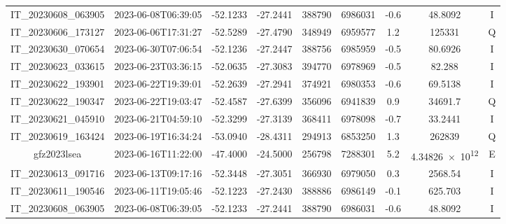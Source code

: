 \begin{center}
\begin{longtable}{ccccS[table-format=6.0]S[table-format=7.0]ccc}
\begin{adjustbox}{width=\textwidth}
    IT\_20230608\_063905 & 2023-06-08T06:39:05 & -52.1233 & -27.2441 & 388790 & 6986031 & -0.6 & \num[round-precision=3,round-mode=figures,scientific-notation=true]{48.8092} & I \\
    IT\_20230606\_173127 & 2023-06-06T17:31:27 & -52.5289 & -27.4790 & 348949 & 6959577 & 1.2 & \num[round-precision=3,round-mode=figures,scientific-notation=true]{125331} & Q \\               IT\_20230630\_070654 & 2023-06-30T07:06:54 & -52.1236 & -27.2447 & 388756 & 6985959 & -0.5 & \num[round-precision=3,round-mode=figures,scientific-notation=true]{80.6926} & I \\
    IT\_20230623\_033615 & 2023-06-23T03:36:15 & -52.0635 & -27.3083 & 394770 & 6978969 & -0.5 & \num[round-precision=3,round-mode=figures,scientific-notation=true]{82.288} & I \\
    IT\_20230622\_193901 & 2023-06-22T19:39:01 & -52.2639 & -27.2941 & 374921 & 6980353 & -0.6 & \num[round-precision=3,round-mode=figures,scientific-notation=true]{69.5138} & I \\
    IT\_20230622\_190347 & 2023-06-22T19:03:47 & -52.4587 & -27.6399 & 356096 & 6941839 & 0.9 & \num[round-precision=3,round-mode=figures,scientific-notation=true]{34691.7} & Q \\
    IT\_20230621\_045910 & 2023-06-21T04:59:10 & -52.3299 & -27.3139 & 368411 & 6978098 & -0.7 & \num[round-precision=3,round-mode=figures,scientific-notation=true]{33.2441} & I \\
    IT\_20230619\_163424 & 2023-06-19T16:34:24 & -53.0940 & -28.4311 & 294913 & 6853250 & 1.3 & \num[round-precision=3,round-mode=figures,scientific-notation=true]{262839} & Q \\
    gfz2023lsea & 2023-06-16T11:22:00 & -47.4000 & -24.5000 & 256798 & 7288301 & 5.2 & \num[round-precision=3,round-mode=figures,scientific-notation=true]{4.34826e+12} & E \\
    IT\_20230613\_091716 & 2023-06-13T09:17:16 & -52.3448 & -27.3051 & 366930 & 6979050 & 0.3 & \num[round-precision=3,round-mode=figures,scientific-notation=true]{2568.54} & I \\
    IT\_20230611\_190546 & 2023-06-11T19:05:46 & -52.1223 & -27.2430 & 388886 & 6986149 & -0.1 & \num[round-precision=3,round-mode=figures,scientific-notation=true]{625.703} & I \\
    IT\_20230608\_063905 & 2023-06-08T06:39:05 & -52.1233 & -27.2441 & 388790 & 6986031 & -0.6 & \num[round-precision=3,round-mode=figures,scientific-notation=true]{48.8092} & I \\

\end{adjustbox}
\end{longtable}
\end{center}
